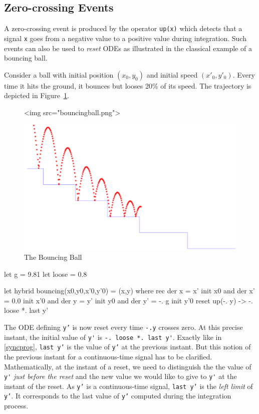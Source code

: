 \documentclass[11pt,titlepage,twoside]{report}
\begin{document}
\subsection{Zero-crossing Events\label{zerocrossings}} %

A zero-crossing event is produced by the operator \texttt{up(x)}
which detects that a signal \texttt{x} goes from a negative value to a
positive value during integration. Such events can also be used
to \emph{reset} ODEs as illustrated in the classical example of a bouncing 
ball.

Consider a ball with initial position $(x_0, y_0)$ and initial speed
$(x'_0, y'_0)$. Every time it hits the ground, it bounces but looses
20\% of its speed. The trajectory is depicted in 
Figure~\cref{bouncing-ball}.

\begin{figure}
\begin{center}
\ifhevea
\begin{rawhtml}
<img src="bouncingball.png">
\end{rawhtml}
\else
\includegraphics[width=.7\textwidth]{Fig/bouncingball}
\fi
\end{center}
\caption{The Bouncing Ball~\label{bouncing-ball}}
\end{figure}

\begin{chklisting}[label=gravity]
let g = 9.81
let loose = 0.8
\end{chklisting}
\begin{chklisting}
let hybrid bouncing(x0,y0,x'0,y'0) = (x,y) where
 rec der x = x' init x0
 and der x' = 0.0 init x'0
 and der y = y' init y0
 and der y' = -. g init y'0 reset up(-. y) -> -. loose *. last y'
\end{chklisting}

The ODE defining \texttt{y'} is now reset every time \texttt{-.y}
crosses zero.  At this precise instant, the initial value of \verb-y'-
is \verb+-. loose *. last y'+. Exactly like in
\cref{syncprog}, \texttt{last y'} is the
value of \texttt{y'} at the previous instant. But this notion of the
previous instant for a continuous-time signal has to be
clarified. Mathematically, at the instant of a reset, we need to
distinguish the the value of \verb-y'- \emph{just before the reset}
and the new value we would like to give to \verb-y'- at the instant of
the reset. As \texttt{y'} is a continuous-time signal, \texttt{last
  y'} is the \emph{left limit} of \texttt{y'}. It corresponds to the
last value of \texttt{y'} computed during the integration process.
\end{document}
